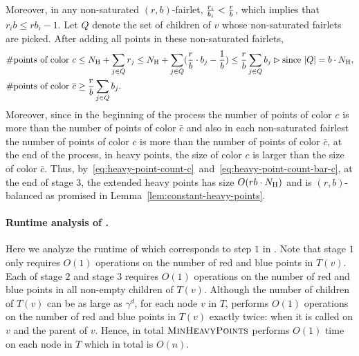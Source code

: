 Moreover, in any  non-saturated $(r,b)$-fairlet, ${r_i \over b_i} < {r \over b}$, which implies that $r_i b \leq rb_i -1$. 
Let $Q$ denote the set of children of $v$ whose non-saturated fairlets are picked. After adding all points in these non-saturated fairlets, %
\begin{align}
\# \text{points of color } c 
&\leq N_{\mathrm{H}} + \sum_{j\in Q} {r_j} \leq N_{\mathrm{H}} + \sum_{j\in Q} ({r \over b}\cdot  b_j - {1\over b}) \leq {r\over b} \sum_{j\in Q} b_j \rhd\text{since $|Q| =b\cdot N_{\mathrm{H}}$},\label{eq:heavy-point-count-c}\\
\# \text{points of color } \overline{c} &\geq {r\over b} \sum_{j\in Q} b_j.\label{eq:heavy-point-count-bar-c}
\end{align}
Moreover, since in the beginning of the process the number of points of color $c$ is more than the number of points of color $\bar{c}$ and also in each non-saturated fairlest the number of points of color $c$ is more than the number of points of color $\bar{c}$, at the end of the process, in heavy points, the size of color $c$ is larger than the size of color $\bar{c}$.
Thus, by~\eqref{eq:heavy-point-count-c}~and~\eqref{eq:heavy-point-count-bar-c}, at the end of stage $3$, the extended heavy points has size $O(rb\cdot N_{\mathrm{H}})$ and is $(r,b)$-balanced as promised in Lemma~\ref{lem:constant-heavy-points}. %



\paragraph{Runtime analysis of \minHeavy.} Here we analyze the runtime of \Call{\minHeavy} which corresponds to step $1$ in \Call{\fairletDec}. Note that stage $1$ only requires $O(1)$ operations on the number of red and blue points in $T(v)$. Each of stage $2$ and stage $3$ requires $O(1)$ operations on the number of red and blue points in all non-empty children of $T(v)$. Although the number of children of $T(v)$ can be as large as $\gamma^d$, for each node $v$ in $T$, \Call{\minHeavy} performs $O(1)$ operations on the number of red and blue points in $T(v)$ exactly twice: when it is called on $v$ and the parent of $v$. Hence, in total $\Call{\minHeavy}$ performs $O(1)$ time on each node in $T$ which in total is $O(n)$.

